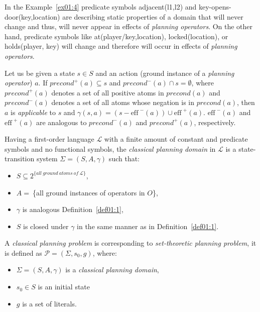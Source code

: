 \medskip\noindent
In the Example~\ref{ex01:4} predicate symbols adjacent(l1,l2) and key-opens-door(key,location) are describing static properties of a domain that will never change and thus, will never appear in effects of \emph{planning operators}. On the other hand, predicate symbols like at(player/key,location), locked(location), or holds(player, key) will change and therefore will occur in effects of \emph{planning operators}.

\begin{defn}\label{def01:6}
Let us be given a state $s \in S$ and an action (ground instance of a \emph{planning operator}) $a$. If $precond^{+}(a) \subseteq s$ and $precond^{-}(a) \cap s = \emptyset$, where $precond^{+}(a)$ denotes a set of all positive atoms in $precond(a)$ and $precond^{-}(a)$ denotes a set of all atoms whose negation is in $precond(a)$, then $a$ is \emph{applicable} to $s$ and $\gamma(s,a)=(s-\text{eff}^{\,\,-}(a)) \cup \text{eff}^{\,\,+}(a)$. $\text{eff}^{\,\,-}(a)$ and $\text{eff}^{\,\,+}(a)$ are analogous to $precond^{-}(a)$ and $precond^{+}(a)$, respectively.
\end{defn}

\begin{defn}\label{def01:7}
Having a first-order language $\mathcal{L}$ with a finite amount of constant and predicate symbols and no functional symbols, the \emph{classical planning domain} in $\mathcal{L}$ is a state-transition system $\Sigma = (S,A,\gamma)$ such that:

    \begin{itemize}
        \item $S \subseteq 2^{\displaystyle \{all~ground~atoms~of~\mathcal{L}\}}$,
        
        \item $A =~$\{all ground instances of operators in $O$\},
        
        \item $\gamma$ is analogous Definition~\ref{def01:1},
        
        \item $S$ is closed under $\gamma$ in the same manner as in Definition~\ref{def01:1}.
    \end{itemize}
\end{defn}

\begin{defn}\label{def01:8}
A \emph{classical planning problem} is corresponding to \emph{set-theoretic planning problem}, it is defined as $\mathcal{P} = (\Sigma,s_0,g)$, where:

    \begin{itemize}
        \item $\Sigma = (S,A,\gamma)$ is a \emph{classical planning domain},
        
        \item $s_0 \in S$ is an initial state
        
        \item $g$ is a set of literals.
    \end{itemize}
\end{defn}
